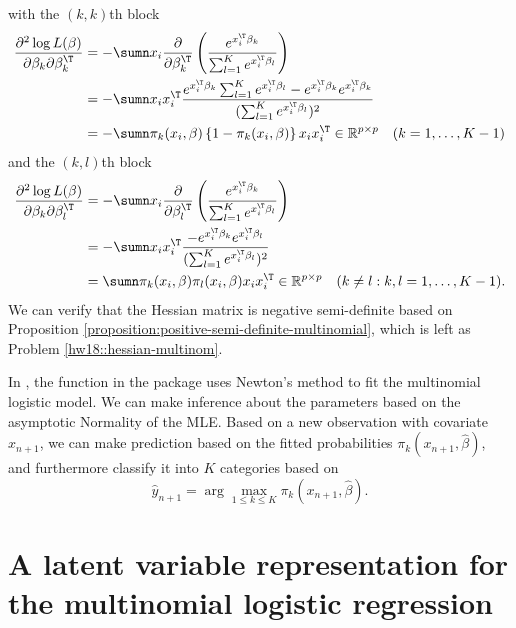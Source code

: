 with the $(k,k)$th block  
\begin{align*}
\frac{\partial^{2}\log L(\beta)}{\partial\beta_{k}\partial\beta_{k}^{\T}} & =-\sumn x_{i}\frac{\partial}{\partial\beta_{k}^{\T}}\left(\frac{e^{x_{i}^{\T}\beta_{k}}}{\sum_{ l =1}^{K}e^{x_{i}^{\T}\beta_{ l }}}\right)\\
 & =-\sumn x_{i}x_{i}^{\T}\frac{e^{x_{i}^{\T}\beta_{k}}\sum_{ l =1}^{K}e^{x_{i}^{\T}\beta_{ l }}-e^{x_{i}^{\T}\beta_{k}}e^{x_{i}^{\T}\beta_{k}}}{(\sum_{ l =1}^{K}e^{x_{i}^{\T}\beta_{ l }})^{2}}\\
 & =-\sumn\pi_{k}(x_{i},\beta)\left\{ 1-\pi_{k}(x_{i},\beta)\right\} x_{i}x_{i}^{\T} \in \mathbb{R}^{p\times p}   \quad(k=1,\ldots,K-1)
\end{align*}
and the $(k, l )$th block  
\begin{align*}
\frac{\partial^{2}\log L(\beta)}{\partial\beta_{k}\partial\beta_{ l }^{\T}} & =-\sumn x_{i}\frac{\partial}{\partial\beta_{ l }^{\T}}\left(\frac{e^{x_{i}^{\T}\beta_{k}}}{\sum_{ l =1}^{K}e^{x_{i}^{\T}\beta_{ l }}}\right)\\
 & =-\sumn x_{i}x_{i}^{\T}\frac{-e^{x_{i}^{\T}\beta_{k}}e^{x_{i}^{\T}\beta_{ l }}}{(\sum_{ l =1}^{K}e^{x_{i}^{\T}\beta_{ l }})^{2}}\\
 & =\sumn\pi_{k}(x_{i},\beta)\pi_{ l }(x_{i},\beta)x_{i}x_{i}^{\T}  \in \mathbb{R}^{p\times p}   \quad(k\neq  l :k, l =1,\ldots,K-1).
\end{align*}
We can verify that the Hessian matrix is negative semi-definite based
on Proposition \ref{proposition:positive-semi-definite-multinomial}, which
is left as Problem \ref{hw18::hessian-multinom}. 


In , the function  in the  package uses Newton's method to fit the multinomial logistic model. We can make inference about the parameters based on the asymptotic Normality of the MLE. Based on a new observation with covariate $x_{n+1}$, we  can make prediction based on the fitted probabilities $\pi_k(x_{n+1}, \hat{\beta})$, and furthermore classify it into $K$ categories based on
$$
\hat{y}_{n+1} = \arg\max_{1\leq k \leq K}  \pi_k(x_{n+1}, \hat{\beta}) . 
$$






\section{A latent variable representation for the multinomial logistic regression}


